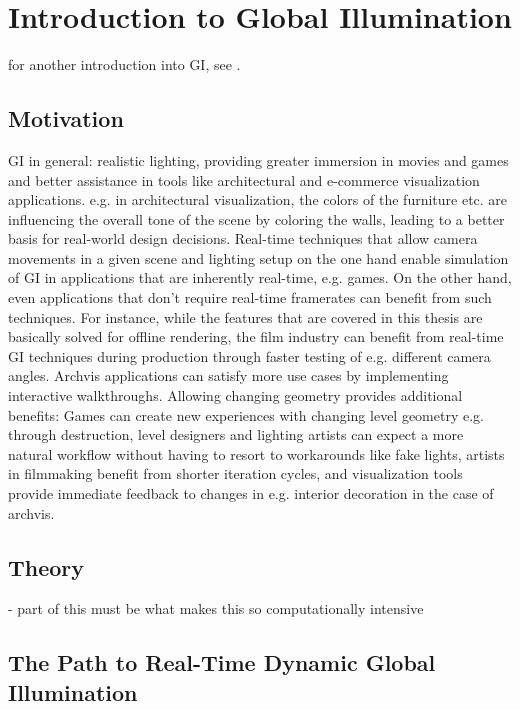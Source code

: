 


\section{Introduction to Global Illumination}

for another introduction into GI, see \citet{Ritschel:2012:GISTAR}.

\subsection{Motivation}
\begin{outline}
\1 GI in general: realistic lighting, providing greater immersion in movies and games and better assistance in tools like architectural and e-commerce visualization applications. e.g. in architectural visualization, the colors of the furniture etc. are influencing the overall tone of the scene by coloring the walls, leading to a better basis for real-world design decisions.
\1 Real-time techniques that allow camera movements in a given scene and lighting setup on the one hand enable simulation of GI in applications that are inherently real-time, e.g. games.
\1 On the other hand, even applications that don't require real-time framerates can benefit from such techniques. For instance, while the features that are covered in this thesis are basically solved for offline rendering, the film industry can benefit from real-time GI techniques during production through faster testing of e.g. different camera angles. Archvis applications can satisfy more use cases by implementing interactive walkthroughs.
\1 Allowing changing geometry provides additional benefits: Games can create new experiences with changing level geometry e.g. through destruction, level designers and lighting artists can expect a more natural workflow without having to resort to workarounds like fake lights, artists in filmmaking benefit from shorter iteration cycles, and visualization tools provide immediate feedback to changes in e.g. interior decoration in the case of archvis.
\end{outline}


\subsection{Theory}

- part of this must be what makes this so computationally intensive


\subsection{The Path to Real-Time Dynamic Global Illumination}

